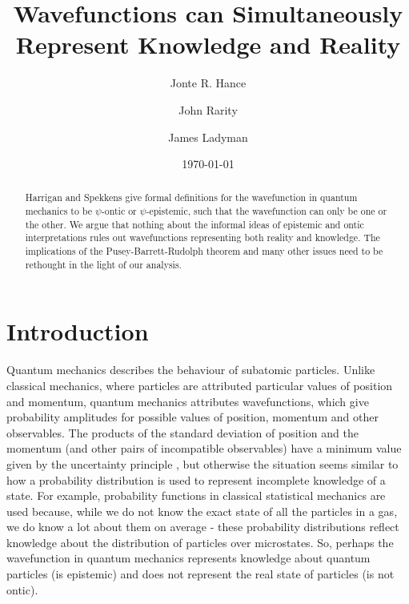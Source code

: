 \documentclass[superscriptaddress, floatfix,nofootinbib,12pt]{revtex4-2}
\begin{document}
\title{Wavefunctions can Simultaneously Represent Knowledge and Reality}

\author{Jonte R. Hance}
\author{John Rarity}
\author{James Ladyman}
\date{\today}

\begin{abstract}

Harrigan and Spekkens give formal definitions for the wavefunction in quantum mechanics to be $\psi$-ontic or $\psi$-epistemic, such that the wavefunction can only be one or the other. We argue that nothing about the informal ideas of epistemic and ontic interpretations rules out wavefunctions representing both reality and knowledge. The implications of the Pusey-Barrett-Rudolph theorem and many other issues need to be rethought in the light of our analysis.

\end{abstract}

\maketitle

\section{Introduction}

Quantum mechanics describes the behaviour of subatomic particles. Unlike classical mechanics, where particles are attributed particular values of position and momentum, quantum mechanics attributes wavefunctions, which give probability amplitudes for possible values of position, momentum and other observables. The products of the standard deviation of position and the momentum (and other pairs of incompatible observables) have a minimum value given by the uncertainty principle \cite{Kennard1927Quantenmechanik}, but otherwise the situation seems similar to how a probability distribution is used to represent incomplete knowledge of a state. For example, probability functions in classical statistical mechanics are used because, while we do not know the exact state of all the particles in a gas, we do know a lot about them on average - these probability distributions reflect knowledge about the distribution of particles over microstates. So, perhaps the wavefunction in quantum mechanics represents knowledge about quantum particles (is epistemic) and does not represent the real state of particles (is not ontic).
\end{document}
